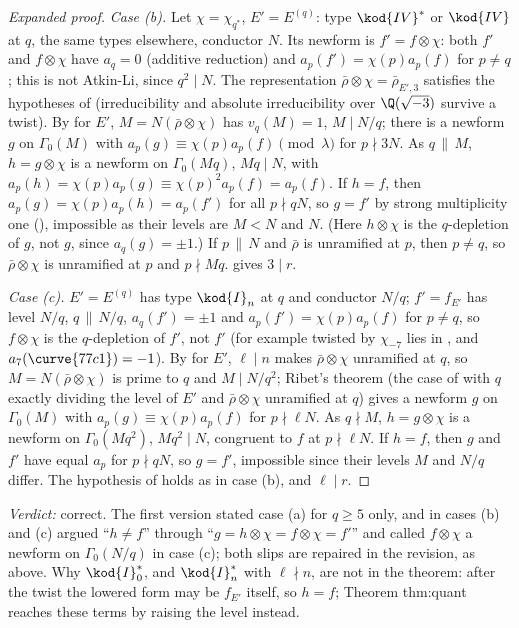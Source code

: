 \begin{sloppypar}
\begin{proof}[Expanded proof]
\emph{Case (b).} Let $\chi=\chi_{q^*}$, $E'=E^{(q)}$: type $\kod{IV}^*$ or $\kod{IV}$ at $q$, the same types elsewhere, conductor $N$. Its newform is $f'=f\otimes\chi$: both $f'$ and $f\otimes\chi$ have
$a_q=0$ (additive reduction) and $a_p(f')=\chi(p)a_p(f)$ for $p\ne q$; this is not Atkin-Li, since $q^2\mid N$. The representation $\bar\rho\otimes\chi=\bar\rho_{E',3}$ satisfies the hypotheses
of  (irreducibility and absolute irreducibility over $\Q(\sqrt{-3})$ survive a twist). By  for $E'$, $M=N(\bar\rho\otimes\chi)$ has $v_q(M)=1$,
$M\mid N/q$; there is a newform $g$ on $\Gamma_0(M)$ with $a_p(g)\equiv\chi(p)a_p(f)\pmod\lambda$ for $p\nmid3N$. As $q\,\|\,M$, $h=g\otimes\chi$ is a newform on $\Gamma_0(Mq)$, $Mq\mid N$, with
$a_p(h)=\chi(p)a_p(g)\equiv\chi(p)^2a_p(f)=a_p(f)$. If $h=f$, then $a_p(g)=\chi(p)a_p(h)=a_p(f')$ for all $p\nmid qN$, so $g=f'$ by strong multiplicity one (), impossible as
their levels are $M<N$ and $N$. (Here $h\otimes\chi$ is the $q$-depletion of $g$, not $g$, since $a_q(g)=\pm1$.) If $p\,\|\,N$ and $\bar\rho$ is unramified at $p$, then $p\ne q$, so $\bar\rho\otimes\chi$ is
unramified at $p$ and $p\nmid Mq$.  gives $3\mid r$.

\emph{Case (c).} $E'=E^{(q)}$ has type $\kod{I}_n$ at $q$ and conductor $N/q$; $f'=f_{E'}$ has level $N/q$, $q\,\|\,N/q$, $a_q(f')=\pm1$ and $a_p(f')=\chi(p)a_p(f)$ for $p\ne q$, so $f\otimes\chi$ is
the $q$-depletion of $f'$, not $f'$ (for example  twisted by $\chi_{-7}$ lies in , and $a_7(\curve{77c1})=-1$). By  for $E'$, $\ell\mid n$ makes $\bar\rho\otimes\chi$
unramified at $q$, so $M=N(\bar\rho\otimes\chi)$ is prime to $q$ and $M\mid N/q^2$; Ribet's theorem (the case of  with $q$ exactly dividing the level of $E'$ and
$\bar\rho\otimes\chi$ unramified at $q$) gives a newform $g$ on $\Gamma_0(M)$ with $a_p(g)\equiv\chi(p)a_p(f)$ for $p\nmid\ell N$. As $q\nmid M$, $h=g\otimes\chi$ is a newform on $\Gamma_0(Mq^2)$, $Mq^2\mid N$,
congruent to $f$ at $p\nmid\ell N$. If $h=f$, then $g$ and $f'$ have equal $a_p$ for $p\nmid qN$, so $g=f'$, impossible since their levels $M$ and $N/q$ differ. The hypothesis of
 holds as in case (b), and $\ell\mid r$.
\end{proof}

\noindent\emph{Verdict:} correct. The first version stated case (a) for $q\ge5$ only, and in cases (b) and (c) argued ``$h\ne f$'' through ``$g=h\otimes\chi=f\otimes\chi=f'$'' and
called $f\otimes\chi$ a newform on $\Gamma_0(N/q)$ in case (c); both slips are repaired in the revision, as above. Why $\kod{I}_0^*$, and $\kod{I}_n^*$ with $\ell\nmid n$, are not in the
theorem: after the twist the lowered form may be $f_{E'}$ itself, so $h=f$; Theorem thm:quant reaches these terms by raising the level instead.


\end{sloppypar}
